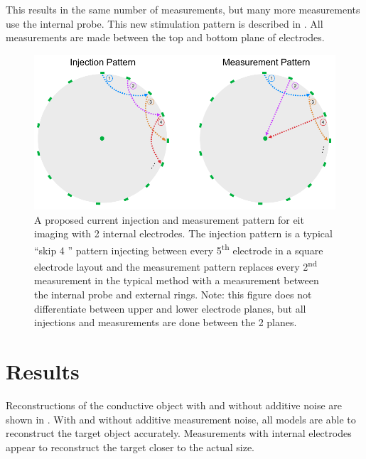 This results in the same number of measurements, but many more measurements
use the internal probe. This new stimulation pattern is described in . 
All measurements are made between the top and bottom plane of electrodes.

\begin{figure}
\centering
\includegraphics[width=\textwidth]{chapter6-internal_electrodes/imgs/current_injection.pdf}
\caption[Current injection patterns with internal electrodes]{A proposed current injection and measurement pattern for \acrshort{eit} imaging with 2 internal electrodes.
The injection pattern is a typical ``skip 4 '' pattern injecting between every 5\textsuperscript{th} electrode in a square electrode layout and the
measurement pattern replaces every 2\textsuperscript{nd} measurement in the typical method with a measurement between the internal probe and
external rings. Note: this figure does not differentiate between upper and lower electrode planes, but all injections and measurements are done between 
the 2 planes.}
\label{fig:modified_measurement}
\end{figure}

\section{Results}

Reconstructions of the conductive object with and without additive noise are 
shown in . With and without additive measurement noise,
all models are able to reconstruct the target object accurately. 
Measurements with internal electrodes appear to reconstruct the target 
closer to the actual size.

